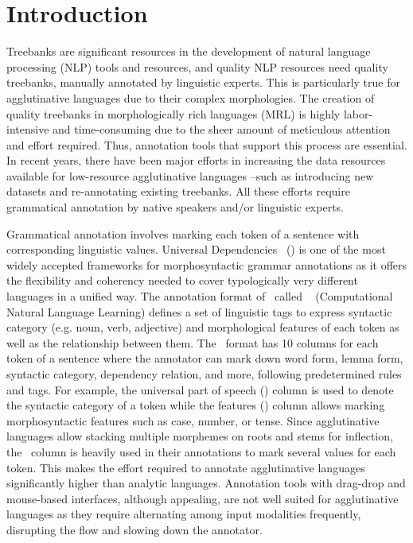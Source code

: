 \section{Introduction}
\label{sec:introduction}

Treebanks are significant resources in the development of natural language processing (NLP) tools and resources, and quality NLP resources need quality treebanks, manually annotated by linguistic experts.
This is particularly true for agglutinative languages due to their complex morphologies.
The creation of quality treebanks in morphologically rich languages (MRL) is highly labor-intensive and time-consuming due to the sheer amount of meticulous attention and effort required.
Thus, annotation tools that support this process are essential.
In recent years, there have been major efforts in increasing the data resources available for low-resource agglutinative languages --such as introducing new datasets and re-annotating existing treebanks.
All these efforts require grammatical annotation by native speakers and/or linguistic experts.

Grammatical annotation involves marking each token of a sentence with corresponding linguistic values.
Universal Dependencies~\cite{ud} (\ud) is one of the most widely accepted frameworks for morphosyntactic grammar annotations as it offers the flexibility and coherency needed to cover typologically very different languages in a unified way.
The annotation format of \ud\ called \conllu~\cite{conll} (Computational Natural Language Learning) defines a set of linguistic tags to express syntactic category (e.g. noun, verb, adjective) and morphological features of each token as well as the relationship between them.
The \conllu\ format has 10 columns for each token of a sentence where the annotator can mark down word form, lemma form, syntactic category, dependency relation, and more, following predetermined rules and tags.
For example, the universal part of speech (\upos) column is used to denote the syntactic category of a token while the features (\feats) column allows marking morphosyntactic features such as case, number, or tense.
Since agglutinative languages allow stacking multiple morphemes on roots and stems for inflection, the \feats\ column is heavily used in their annotations to mark several values for each token.
This makes the effort required to annotate agglutinative languages significantly higher than analytic languages.
Annotation tools with drag-drop and mouse-based interfaces, although appealing, are not well suited for agglutinative languages as they require alternating among input modalities frequently, disrupting the flow and slowing down the annotator.

